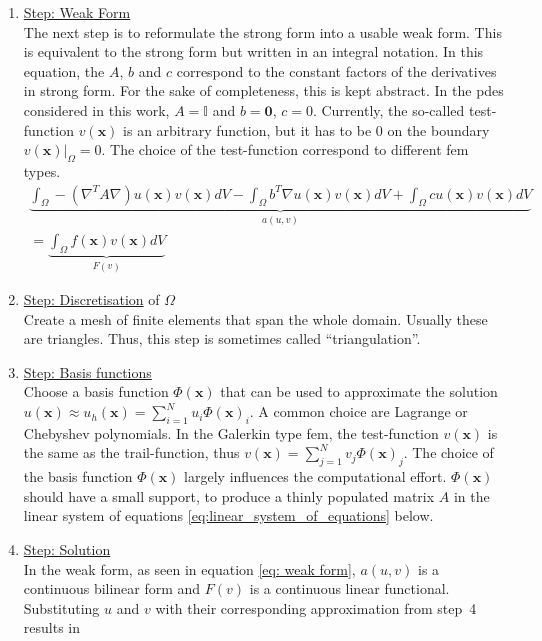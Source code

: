 \documentclass[./\jobname.tex]{subfiles}
\begin{document}
\begin{enumerate}
	\item \underline{Step: Weak Form} \\
		  The next step is to reformulate the strong form into a usable weak form. This is equivalent to the strong form but written in an integral notation. In this equation, the $A$, $b$ and $c$ correspond to the constant factors of the derivatives in strong form. For the sake of completeness, this is kept abstract. In the \gls{pde}s considered in this work, $A = \mathbb{I}$ and $b=\mathbf{0}$, $c = 0$. Currently, the so-called test-function $v(\mathbf{x})$ is an arbitrary function, but it has to be 0 on the boundary $v(\mathbf{x})|_{\Omega} = 0$. The choice of the test-function correspond to different \gls{fem} types. \cite[p. 6f]{shen_spectral_2011}\\
		  \begin{equation}
		  \label{eq: weak form}
			  \begin{split}
			      \underbrace{\int_{\Omega} - (\nabla^T A \nabla) u(\mathbf{x}) v(\mathbf{x}) dV - \int_{\Omega} b^T \nabla u(\mathbf{x}) v(\mathbf{x}) dV + \int_{\Omega} c u(\mathbf{x}) v(\mathbf{x}) dV}_{a(u,v)} \\ = \underbrace{\int_{\Omega} f(\mathbf{x}) v(\mathbf{x}) dV}_{F(v)}
			  \end{split}
		  \end{equation} 
	\item \underline{Step: Discretisation} of $\Omega$ \\
		  Create a mesh of finite elements that span the whole domain. Usually these are triangles. Thus, this step is sometimes called ``triangulation''.
	\item \underline{Step: Basis functions} \\
		  Choose a basis function $\Phi(\mathbf{x})$ that can be used to approximate the solution $u(\mathbf{x}) \approx u_{h}(\mathbf{x}) = \sum_{i = 1}^{N} u_i \Phi(\mathbf{x})_i$. A common choice are Lagrange or Chebyshev polynomials. In the Galerkin type \gls{fem}, the test-function $v(\mathbf{x})$ is the same as the trail-function, thus $v(\mathbf{x}) = \sum_{j = 1}^{N} v_j \Phi(\mathbf{x})_j$. The choice of the basis function $\Phi(\mathbf{x})$ largely influences the computational effort.  $\Phi(\mathbf{x})$ should have a small support, to produce a thinly populated matrix $A$ in the linear system of equations \eqref{eq:linear_system_of_equations} below.
	\item \underline{Step: Solution} \\
		  In the weak form, as seen in equation \eqref{eq: weak form}, $a(u,v)$ is a continuous bilinear form and $F(v)$ is a continuous linear functional. Substituting $u$ and $v$ with their corresponding approximation from \mbox{step 4} results in 

\end{enumerate}
\end{document}
